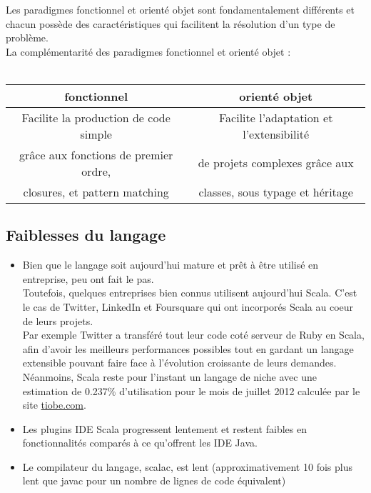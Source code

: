 Les paradigmes fonctionnel et orienté objet sont fondamentalement différents
et chacun possède des caractéristiques qui facilitent la résolution d'un type
de problème.\\
La complémentarité des paradigmes fonctionnel et orienté objet :\\\\
\begin{tabular}{|c|c|}
  \hline
  \textbf{fonctionnel} & \textbf{orienté objet}\\
  \hline
  Facilite la production de code simple & Facilite l'adaptation et l'extensibilité\\
  grâce aux fonctions de premier ordre, & de projets complexes grâce aux\\
  closures, et pattern matching & classes, sous typage et héritage \\
  \hline
\end{tabular}


\subsection{Faiblesses du langage}
\begin{itemize}
\item[\textbullet] Bien que le langage soit aujourd'hui mature et prêt à être utilisé en
  entreprise, peu ont fait le pas.\\
  Toutefois, quelques entreprises bien connus utilisent aujourd'hui Scala.
  C'est le cas de Twitter, LinkedIn et Foursquare qui ont incorporés Scala au
  coeur de leurs projets.\\
  Par exemple Twitter a transféré tout leur code coté serveur de Ruby en Scala,
  afin d'avoir les meilleurs performances possibles tout en gardant un langage
  extensible pouvant faire face à l'évolution croissante de leurs demandes.\\

  Néanmoins, Scala reste pour l'instant un langage de niche avec une estimation
  de 0.237\% d'utilisation pour le mois de juillet 2012 calculée par le site
  \href{http://www.tiobe.com/index.php/content/paperinfo/tpci/index.html}{tiobe.com}.\\
\item[\textbullet] Les plugins IDE Scala progressent lentement et restent
  faibles en fonctionnalités comparés à ce qu'offrent les IDE Java.\\
\item[\textbullet] Le compilateur du langage, scalac, est lent
  (approximativement 10 fois plus lent que javac pour un nombre de lignes de
  code équivalent)\\
\end{itemize}

